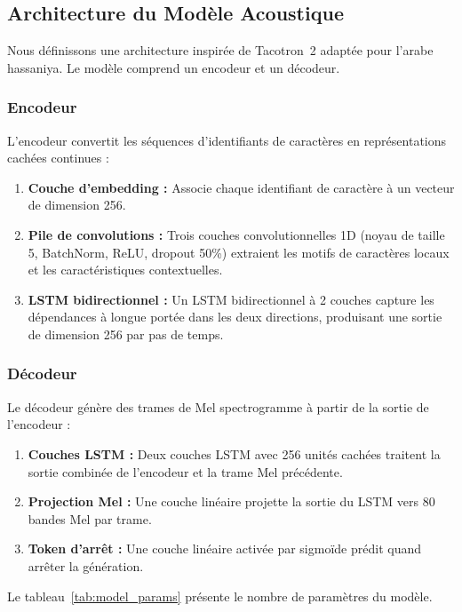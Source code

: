 \documentclass[12pt,a4paper]{article}
\begin{document}
\subsection{Architecture du Modèle Acoustique}

Nous définissons une architecture inspirée de Tacotron~2 adaptée pour l'arabe hassaniya. Le modèle comprend un encodeur et un décodeur.

\subsubsection{Encodeur}

L'encodeur convertit les séquences d'identifiants de caractères en représentations cachées continues :

\begin{enumerate}
    \item \textbf{Couche d'embedding :} Associe chaque identifiant de caractère à un vecteur de dimension 256.
    \item \textbf{Pile de convolutions :} Trois couches convolutionnelles 1D (noyau de taille 5, BatchNorm, ReLU, dropout 50\%) extraient les motifs de caractères locaux et les caractéristiques contextuelles.
    \item \textbf{LSTM bidirectionnel :} Un LSTM bidirectionnel à 2 couches capture les dépendances à longue portée dans les deux directions, produisant une sortie de dimension 256 par pas de temps.
\end{enumerate}

\subsubsection{Décodeur}

Le décodeur génère des trames de Mel spectrogramme à partir de la sortie de l'encodeur :

\begin{enumerate}
    \item \textbf{Couches LSTM :} Deux couches LSTM avec 256 unités cachées traitent la sortie combinée de l'encodeur et la trame Mel précédente.
    \item \textbf{Projection Mel :} Une couche linéaire projette la sortie du LSTM vers 80 bandes Mel par trame.
    \item \textbf{Token d'arrêt :} Une couche linéaire activée par sigmoïde prédit quand arrêter la génération.
\end{enumerate}

Le tableau~\ref{tab:model_params} présente le nombre de paramètres du modèle.
\end{document}
